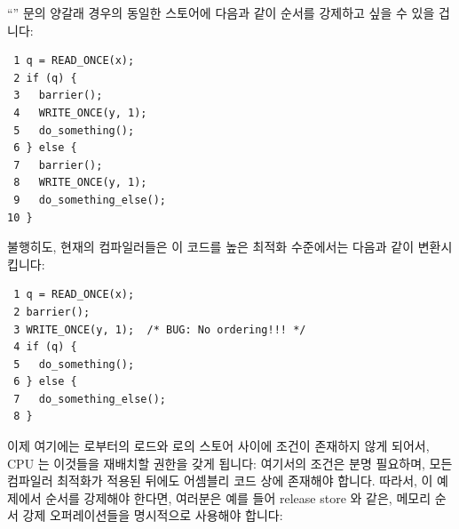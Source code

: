 ``'' 문의 양갈래 경우의 동일한 스토어에 다음과 같이 순서를 강제하고 싶을
수 있을 겁니다:

\vspace{5pt}
\begin{minipage}[t]{\columnwidth}
\scriptsize
\begin{verbatim}
 1 q = READ_ONCE(x);
 2 if (q) {
 3   barrier();
 4   WRITE_ONCE(y, 1);
 5   do_something();
 6 } else {
 7   barrier();
 8   WRITE_ONCE(y, 1);
 9   do_something_else();
10 }
\end{verbatim}
\end{minipage}
\vspace{5pt}

불행히도, 현재의 컴파일러들은 이 코드를 높은 최적화 수준에서는 다음과 같이
변환시킵니다:

\vspace{5pt}
\begin{minipage}[t]{\columnwidth}
\scriptsize
\begin{verbatim}
 1 q = READ_ONCE(x);
 2 barrier();
 3 WRITE_ONCE(y, 1);  /* BUG: No ordering!!! */
 4 if (q) {
 5   do_something();
 6 } else {
 7   do_something_else();
 8 }
\end{verbatim}
\end{minipage}
\vspace{5pt}

이제 여기에는  로부터의 로드와  로의 스토어 사이에 조건이 존재하지
않게 되어서, CPU 는 이것들을 재배치할 권한을 갖게 됩니다:
여기서의 조건은 분명 필요하며, 모든 컴파일러 최적화가 적용된 뒤에도 어셈블리
코드 상에 존재해야 합니다.
따라서, 이 예제에서 순서를 강제해야 한다면, 여러분은 예를 들어 release store 와
같은, 메모리 순서 강제 오퍼레이션들을 명시적으로 사용해야 합니다:

